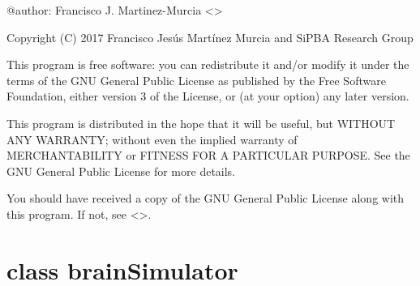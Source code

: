 \documentclass[letterpaper,10pt,english]{sphinxmanual}
\begin{document}
@author: Francisco J. Martinez-Murcia \textless{}\textgreater{}

Copyright (C) 2017 Francisco Jesús Martínez Murcia and SiPBA Research Group

This program is free software: you can redistribute it and/or modify
it under the terms of the GNU General Public License as published by
the Free Software Foundation, either version 3 of the License, or
(at your option) any later version.

This program is distributed in the hope that it will be useful,
but WITHOUT ANY WARRANTY; without even the implied warranty of
MERCHANTABILITY or FITNESS FOR A PARTICULAR PURPOSE.  See the
GNU General Public License for more details.

You should have received a copy of the GNU General Public License
along with this program.  If not, see \textless{}\textgreater{}.


\section{class brainSimulator}
\label{\detokenize{api:class-brainsimulator}}
\end{document}

